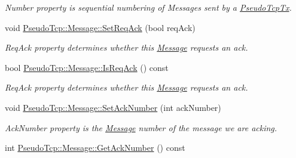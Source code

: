 \begin{DoxyCompactItemize}
\begin{DoxyCompactList}\small\item\em Number property is sequential numbering of Messages sent by a \hyperlink{classPseudoTcp_1_1PseudoTcpTx}{PseudoTcpTx}. \item\end{DoxyCompactList}\item 
\hypertarget{group__group1_ga4fee4812147aa855109d0aed46a6030c}{
void \hyperlink{group__group1_ga4fee4812147aa855109d0aed46a6030c}{PseudoTcp::Message::SetReqAck} (bool reqAck)}
\label{group__group1_ga4fee4812147aa855109d0aed46a6030c}

\begin{DoxyCompactList}\small\item\em ReqAck property determines whether this \hyperlink{classPseudoTcp_1_1Message}{Message} requests an ack. \item\end{DoxyCompactList}\item 
\hypertarget{group__group1_gae74d45f2834806fda6d72c44f651793c}{
bool \hyperlink{group__group1_gae74d45f2834806fda6d72c44f651793c}{PseudoTcp::Message::IsReqAck} () const }
\label{group__group1_gae74d45f2834806fda6d72c44f651793c}

\begin{DoxyCompactList}\small\item\em ReqAck property determines whether this \hyperlink{classPseudoTcp_1_1Message}{Message} requests an ack. \item\end{DoxyCompactList}\item 
\hypertarget{group__group1_ga2c8aa429145e2bf950d0e1b4f25e5f1c}{
void \hyperlink{group__group1_ga2c8aa429145e2bf950d0e1b4f25e5f1c}{PseudoTcp::Message::SetAckNumber} (int ackNumber)}
\label{group__group1_ga2c8aa429145e2bf950d0e1b4f25e5f1c}

\begin{DoxyCompactList}\small\item\em AckNumber property is the \hyperlink{classPseudoTcp_1_1Message}{Message} number of the message we are acking. \item\end{DoxyCompactList}\item 
\hypertarget{group__group1_ga5cb28e660d6cbed4a7bffbe6c2597cb9}{
int \hyperlink{group__group1_ga5cb28e660d6cbed4a7bffbe6c2597cb9}{PseudoTcp::Message::GetAckNumber} () const }
\label{group__group1_ga5cb28e660d6cbed4a7bffbe6c2597cb9}


\end{DoxyCompactItemize}
